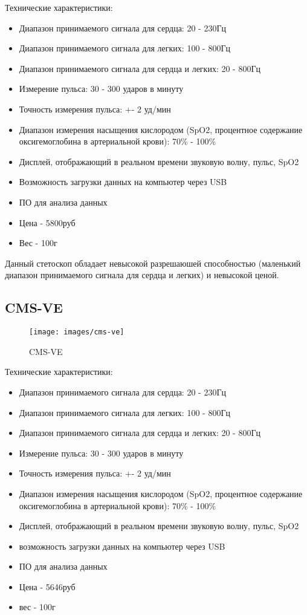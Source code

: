 \documentclass[../main.tex]{subfiles}
\begin{document}
Технические характеристики:\cite{cms-vesd}
\begin{itemize}
  \item Диапазон принимаемого сигнала для сердца: 20 - 230Гц
  \item Диапазон принимаемого сигнала для легких: 100 - 800Гц
  \item Диапазон принимаемого сигнала для сердца и легких: 20 - 800Гц
  \item Измерение пульса: 30 - 300 ударов в минуту
  \item Точность измерения пульса: +- 2 уд/мин
  \item Диапазон измерения насыщения кислородом (SpO2, процентное содержание оксигемоглобина в артериальной крови): 70\% - 100\%
  \item Дисплей, отображающий в реальном времени звуковую волну, пульс, SpO2
  \item Возможность загрузки данных на компьютер через USB
  \item ПО для анализа данных
  \item Цена - 5800руб
  \item Вес - 100г
\end{itemize}

Данный стетоскоп обладает невысокой разрешаюшей способностью (маленький диапазон принимаемого сигнала для сердца и легких) и невысокой ценой.

\subsection{CMS-VE}
\begin{figure}[H]
\centering
\texttt{[image: images/cms-ve]}
\caption{CMS-VE}
\end{figure}

Технические характеристики:\cite{cms-ve}
\begin{itemize}
  \item Диапазон принимаемого сигнала для сердца: 20 - 230Гц
  \item Диапазон принимаемого сигнала для легких: 100 - 800Гц
  \item Диапазон принимаемого сигнала для сердца и легких: 20 - 800Гц
  \item Измерение пульса: 30 - 300 ударов в минуту
  \item Точность измерения пульса: +- 2 уд/мин
  \item Диапазон измерения насыщения кислородом (SpO2, процентное содержание оксигемоглобина в артериальной крови): 70\% - 100\%
  \item Дисплей, отображающий в реальном времени звуковую волну, пульс, SpO2
  \item возможность загрузки данных на компьютер через USB
  \item ПО для анализа данных
  \item Цена - 5646руб
  \item вес - 100г
\end{itemize}
\end{document}

